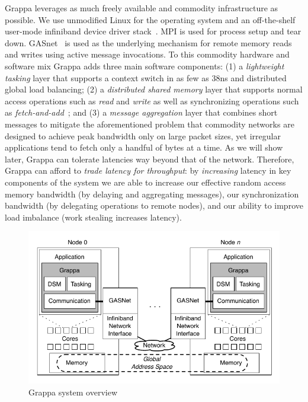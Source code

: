 Grappa leverages as much freely available and commodity infrastructure as possible. We use unmodified Linux for the operating system and an off-the-shelf user-mode infiniband device driver stack~\cite{OFED}. MPI is used for process setup and tear down. GASnet~\cite{gasnet} is used as the underlying mechanism for remote memory reads and writes using active message invocations. To this commodity hardware and software mix Grappa adds three main software components: (1) a \emph{lightweight tasking\/} layer that supports a context switch in as few as 38ns and distributed global load balancing; (2) a \emph{distributed shared memory\/} layer that supports normal access operations such as \emph{read\/} and \emph{write\/} as well as synchronizing operations such as \emph{fetch-and-add\/}~\cite{fetchandadd}; and (3) a \emph{message aggregation\/} layer that combines short messages to mitigate the aforementioned problem that commodity networks are designed to achieve peak bandwidth only on large packet sizes, yet irregular applications tend to fetch only a handful of bytes at a time. As we will show later, Grappa can tolerate latencies way beyond that of the network. Therefore, Grappa can afford to \emph{trade latency for throughput\/}: by {\em increasing\/} latency in key components of the system we are able to increase our effective random access memory bandwidth (by delaying and aggregating messages), our synchronization bandwidth (by delegating operations to remote nodes), and our ability to improve load imbalance (work stealing increases latency).

\begin{figure}[t]
\begin{center}     
  \includegraphics[width=0.95\columnwidth]{figs/system-overview}
\begin{minipage}{0.95\columnwidth} 
  \caption{\label{fig:grappa} Grappa system overview}
\end{minipage}
\vspace{-3ex}
\end{center}
\end{figure}

